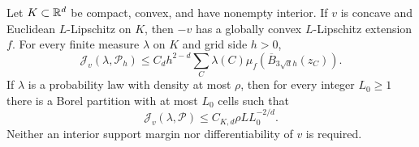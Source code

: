 \begin{lemma}\label{lem:curvature}
Let $K\subset\mathbb R^d$ be compact, convex, and have nonempty interior. If $v$ is concave and Euclidean $L$-Lipschitz on $K$, then $-v$ has a globally convex $L$-Lipschitz extension $f$. For every finite measure $\lambda$ on $K$ and grid side $h>0$,
\begin{equation}\label{eq:curvbound}
 \mathcal J_v(\lambda,\mathcal P_h)
 \le C_d h^{2-d}\sum_C\lambda(C)
 \mu_f(\overline B_{3\sqrt d h}(z_C)).
\end{equation}
If $\lambda$ is a probability law with density at most $\rho$, then for every integer $L_0\ge1$ there is a Borel partition with at most $L_0$ cells such that
\begin{equation}\label{eq:gridrate}
 \mathcal J_v(\lambda,\mathcal P)\le C_{K,d}\rho L L_0^{-2/d}.
\end{equation}
Neither an interior support margin nor differentiability of $v$ is required.
\end{lemma}
